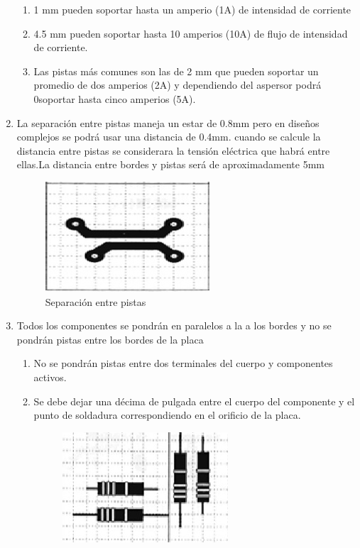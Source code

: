 \documentclass[a4paper,12pt,twoside]{proyectotanquesecci}
\begin{document}
\begin{enumerate}
\begin{enumerate}
\item 1 mm pueden soportar hasta un amperio (1A) de intensidad de corriente
\item 4.5 mm  pueden soportar hasta 10 amperios (10A) de flujo de intensidad de corriente.
\item Las pistas más comunes son las de 2 mm que pueden soportar un promedio de dos amperios (2A) y dependiendo del aspersor podrá 0soportar hasta cinco amperios (5A).	
\end{enumerate}
\item La separación  entre pistas  maneja un estar de 0.8mm pero en diseños complejos se podrá usar una distancia de 0.4mm. cuando se calcule la distancia entre pistas se considerara la tensión eléctrica que habrá entre ellas.La distancia  entre bordes y pistas  será de aproximadamente 5mm
 \begin{figure}[h]
 \centering
 \includegraphics[scale=1.0]{pauta61.jpg}
 \renewcommand{\figurename}{Fig.}
 \caption{Separación entre pistas}
 \label{Separación entre pistas}
 \end{figure}
\item Todos los componentes se pondrán en paralelos a la a los bordes y no se pondrán pistas entre los bordes de la placa
\begin{enumerate}
\item No se pondrán pistas entre dos terminales del cuerpo y componentes activos.
\item Se debe dejar una décima de pulgada  entre el cuerpo del componente y el punto de soldadura correspondiendo en el orificio de la placa.
\begin{figure}[h]
 \centering
 \includegraphics[scale=1.0]{pauta8.jpg}

\end{figure}
\end{enumerate}
\end{enumerate}
\end{document}
